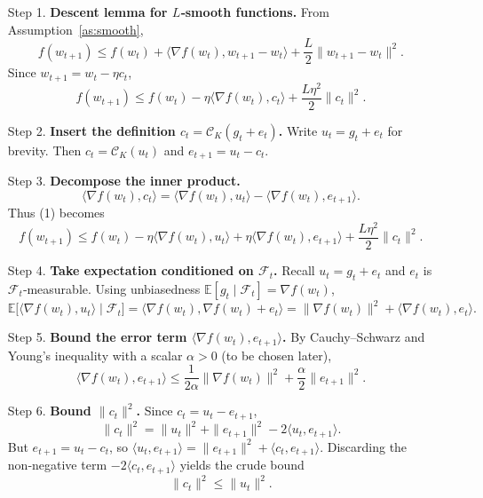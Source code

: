 \documentclass{article}
\newcommand{\E}{\mathbb{E}}
\newcommand{\C}{\mathcal{C}}
\begin{document}
\begin{enumerate}
\item[Step 1.] \textbf{Descent lemma for $L$‑smooth functions.}  
From Assumption~\ref{as:smooth},
\[
    f(w_{t+1})\le f(w_{t})+\langle\nabla f(w_{t}), w_{t+1}-w_{t}\rangle
        +\frac{L}{2}\|w_{t+1}-w_{t}\|^{2}.
\]
Since $w_{t+1}=w_{t}-\eta c_{t}$,
\[
    f(w_{t+1})\le f(w_{t})-\eta\langle\nabla f(w_{t}),c_{t}\rangle
        +\frac{L\eta^{2}}{2}\|c_{t}\|^{2}. \tag{1}
\]

\item[Step 2.] \textbf{Insert the definition $c_{t}=\C_{K}(g_{t}+e_{t})$.}  
Write $u_{t}=g_{t}+e_{t}$ for brevity. Then $c_{t}= \C_{K}(u_{t})$ and $e_{t+1}=u_{t}-c_{t}$.

\item[Step 3.] \textbf{Decompose the inner product.}
\[
    \langle\nabla f(w_{t}),c_{t}\rangle
    =\langle\nabla f(w_{t}),u_{t}\rangle-\langle\nabla f(w_{t}),e_{t+1}\rangle.
\]
Thus (1) becomes
\[
    f(w_{t+1})\le f(w_{t})-\eta\langle\nabla f(w_{t}),u_{t}\rangle
        +\eta\langle\nabla f(w_{t}),e_{t+1}\rangle
        +\frac{L\eta^{2}}{2}\|c_{t}\|^{2}. \tag{2}
\]

\item[Step 4.] \textbf{Take expectation conditioned on $\mathcal{F}_{t}$.}  
Recall $u_{t}=g_{t}+e_{t}$ and $e_{t}$ is $\mathcal{F}_{t}$‑measurable.
Using unbiasedness $\E[g_{t}\mid\mathcal{F}_{t}]=\nabla f(w_{t})$,
\[
    \E\bigl[\langle\nabla f(w_{t}),u_{t}\rangle\mid\mathcal{F}_{t}\bigr]
    =\langle\nabla f(w_{t}),\nabla f(w_{t})+e_{t}\rangle
    =\|\nabla f(w_{t})\|^{2}+\langle\nabla f(w_{t}),e_{t}\rangle. \tag{3}
\]

\item[Step 5.] \textbf{Bound the error term $\langle\nabla f(w_{t}),e_{t+1}\rangle$.}  
By Cauchy–Schwarz and Young’s inequality with a scalar $\alpha>0$ (to be chosen later),
\[
    \langle\nabla f(w_{t}),e_{t+1}\rangle
    \le \frac{1}{2\alpha}\|\nabla f(w_{t})\|^{2}
        +\frac{\alpha}{2}\|e_{t+1}\|^{2}. \tag{4}
\]

\item[Step 6.] \textbf{Bound $\|c_{t}\|^{2}$.}  
Since $c_{t}=u_{t}-e_{t+1}$,
\[
    \|c_{t}\|^{2}= \|u_{t}\|^{2}+\|e_{t+1}\|^{2}-2\langle u_{t},e_{t+1}\rangle.
\]
But $e_{t+1}=u_{t}-c_{t}$, so $\langle u_{t},e_{t+1}\rangle=\|e_{t+1}\|^{2}+\langle c_{t},e_{t+1}\rangle$.
Discarding the non‑negative term $-2\langle c_{t},e_{t+1}\rangle$ yields the crude bound
\[
    \|c_{t}\|^{2}\le \|u_{t}\|^{2}. \tag{5}
\]


\end{enumerate}
\end{document}

